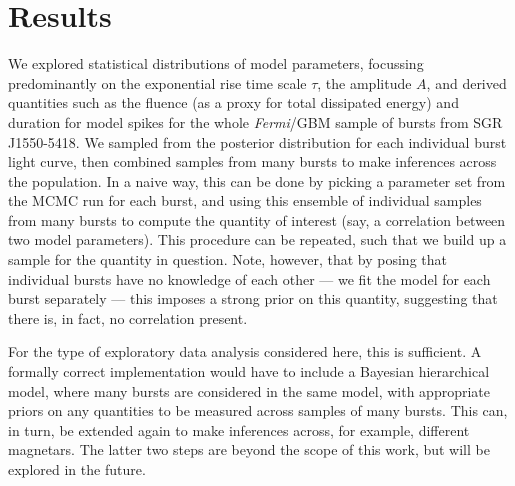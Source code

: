 \documentclass[12pt]{emulateapj}
\newcommand{\project}[1]{\textsl{#1}}
\newcommand{\fermi}{\project{Fermi}}
\begin{document}
\section{Results}
\label{ch6:results}
We explored statistical distributions of model parameters, focussing predominantly on the exponential rise time scale $\tau$, 
the amplitude $A$, and derived quantities such as the fluence (as a proxy for total dissipated energy) and duration for model spikes for
 the whole \fermi/GBM sample of bursts from SGR J1550-5418. We sampled from the posterior distribution for each individual burst light curve, then combined
 samples from many bursts to make inferences across the population.
 In a naive way, this can be done by picking a parameter set from the MCMC run for each burst, and using this ensemble of individual samples from many bursts 
to compute the quantity of interest (say, a correlation between two model parameters). This procedure can be repeated, such that we build up a sample
for the quantity in question. Note, however, that by posing that individual bursts have no knowledge of each other --- we fit the model for each burst separately --- 
this imposes a strong prior on this quantity, suggesting that there is, in fact, no correlation present. 

For the type of exploratory data analysis considered here, this is sufficient. A formally correct implementation would have to include a Bayesian hierarchical model,
where many bursts are considered in the same model, with appropriate priors on any quantities to be measured across samples of many bursts. This can, in turn,
be extended again to make inferences across, for example, different magnetars. The latter two steps are beyond the scope of this work, but will be explored in the future.
\end{document}
